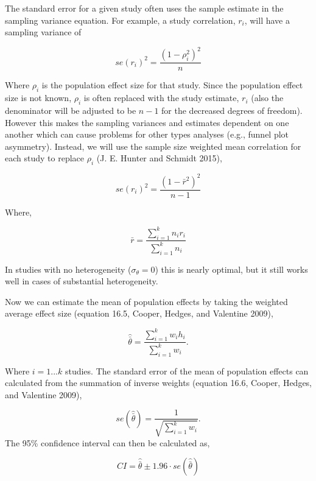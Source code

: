 \documentclass[
  letterpaper,
  DIV=11,
  numbers=noendperiod]{scrreprt}
\begin{document}
\begin{tcolorbox}[enhanced jigsaw, opacityback=0, coltitle=black, toprule=.15mm, colframe=quarto-callout-tip-color-frame, bottomtitle=1mm, rightrule=.15mm, colbacktitle=quarto-callout-tip-color!10!white, left=2mm, bottomrule=.15mm, breakable, title={Calculating Standard Errors}, colback=white, opacitybacktitle=0.6, titlerule=0mm, arc=.35mm, leftrule=.75mm, toptitle=1mm]

The standard error for a given study often uses the sample estimate in
the sampling variance equation. For example, a study correlation,
\(r_i\), will have a sampling variance of

\[
se(r_i)^2 = \frac{(1-\rho_i^2)^2}{n}
\]

Where \(\rho_i\) is the population effect size for that study. Since the
population effect size is not known, \(\rho_i\) is often replaced with
the study estimate, \(r_i\) (also the denominator will be adjusted to be
\(n-1\) for the decreased degrees of freedom). However this makes the
sampling variances and estimates dependent on one another which can
cause problems for other types analyses (e.g., funnel plot asymmetry).
Instead, we will use the sample size weighted mean correlation for each
study to replace \(\rho_i\) (J. E. Hunter and Schmidt 2015),

\[
se(r_i)^2 = \frac{\left(1-\bar{r}^2\right)^2}{n-1}
\]

Where,

\[
\bar{r} = \frac{\sum^k_{i=1}n_ir_i}{\sum^k_{i=1}n_i}
\]

In studies with no heterogeneity (\(\sigma_\theta=0\)) this is nearly
optimal, but it still works well in cases of substantial heterogeneity.

\end{tcolorbox}

Now we can estimate the mean of population effects by taking the
weighted average effect size (equation 16.5, Cooper, Hedges, and
Valentine 2009),

\[
\hat{\bar{\theta}} = \frac{\sum^k_{i=1}w_i h_i}{\sum^k_{i=1}w_i}.
\]

Where \(i=1...k\) studies. The standard error of the mean of population
effects can calculated from the summation of inverse weights (equation
16.6, Cooper, Hedges, and Valentine 2009),

\[
se(\hat{\bar{\theta}}) = \frac{1}{\sqrt{\sum^k_{i=1}w_i}}.
\] The 95\% confidence interval can then be calculated as,

\[
CI = \hat{\bar{\theta}} \pm 1.96\cdot se(\hat{\bar{\theta}})
\]
\end{document}

